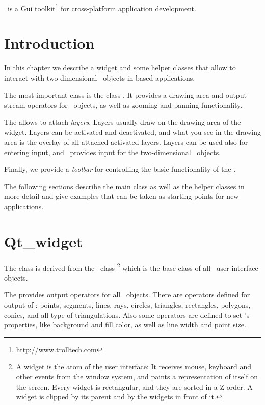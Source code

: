 \qt\ is a {\sc Gui} toolkit\footnote{http://www.trolltech.com} for
cross-platform application development. 

\section{Introduction}

In this chapter we describe a widget and some helper classes that
allow to interact with two dimensional \cgal\ objects in \qt\/ based applications.

The most important class is the class . It provides
a drawing area and output stream operators for \cgal\ objects, as well
as zooming and panning functionality.

The  allows to attach {\em layers}. Layers usually
draw on the drawing area of the widget. Layers can be activated and
deactivated, and what you see in the drawing area is the overlay of
all attached activated layers. Layers can be used also for entering
input, and \cgal\ provides input  for the two-dimensional
\cgal\ objects.

Finally, we provide a {\em toolbar} for controlling the basic functionality
of the .

The following sections describe the main class as well as the helper classes
in more detail and give examples that can be taken as starting points for
new applications.


\section{Qt\_widget}
\label{Qt_widget}

The class  is derived from the \qt\ class %
\footnote{A widget is the atom of the user interface: It receives mouse, keyboard and other 
events from the window system, and paints a representation of itself on the 
screen. Every widget is rectangular, and they are sorted in a Z-order. A 
widget is clipped by its parent and by the widgets in front of it.} 
which is the base class of all \qt\ user interface objects. 


The  provides output operators for all \cgal\
objects. There are operators defined for output of : points, segments, 
lines, rays, circles, triangles, rectangles, polygons, conics,  and all type of
triangulations. Also some operators are defined to set
's properties, like background and fill color, as
well as line width and point size.

